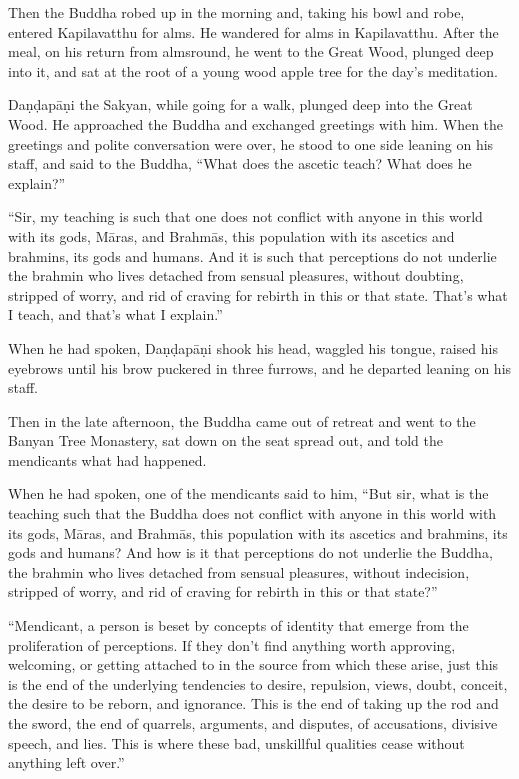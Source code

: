 \documentclass[12pt,openany]{book}%
\begin{document}
Then the Buddha robed up in the morning and, taking his bowl and robe, entered Kapilavatthu for alms. He wandered for alms in Kapilavatthu. After the meal, on his return from almsround, he went to the Great Wood, plunged deep into it, and sat at the root of a young wood apple tree for the day’s meditation. 

\textsanskrit{Daṇḍapāṇi} the Sakyan, while going for a walk, plunged deep into the Great Wood. He approached the Buddha and exchanged greetings with him. When the greetings and polite conversation were over, he stood to one side leaning on his staff, and said to the Buddha, “What does the ascetic teach? What does he explain?” 

“Sir, my teaching is such that one does not conflict with anyone in this world with its gods, \textsanskrit{Māras}, and \textsanskrit{Brahmās}, this population with its ascetics and brahmins, its gods and humans. And it is such that perceptions do not underlie the brahmin who lives detached from sensual pleasures, without doubting, stripped of worry, and rid of craving for rebirth in this or that state. That’s what I teach, and that’s what I explain.” 

When he had spoken, \textsanskrit{Daṇḍapāṇi} shook his head, waggled his tongue, raised his eyebrows until his brow puckered in three furrows, and he departed leaning on his staff. 

Then in the late afternoon, the Buddha came out of retreat and went to the Banyan Tree Monastery, sat down on the seat spread out, and told the mendicants what had happened. 

When he had spoken, one of the mendicants said to him, “But sir, what is the teaching such that the Buddha does not conflict with anyone in this world with its gods, \textsanskrit{Māras}, and \textsanskrit{Brahmās}, this population with its ascetics and brahmins, its gods and humans? And how is it that perceptions do not underlie the Buddha, the brahmin who lives detached from sensual pleasures, without indecision, stripped of worry, and rid of craving for rebirth in this or that state?” 

“Mendicant, a person is beset by concepts of identity that emerge from the proliferation of perceptions. If they don’t find anything worth approving, welcoming, or getting attached to in the source from which these arise, just this is the end of the underlying tendencies to desire, repulsion, views, doubt, conceit, the desire to be reborn, and ignorance. This is the end of taking up the rod and the sword, the end of quarrels, arguments, and disputes, of accusations, divisive speech, and lies. This is where these bad, unskillful qualities cease without anything left over.” 
\end{document}
